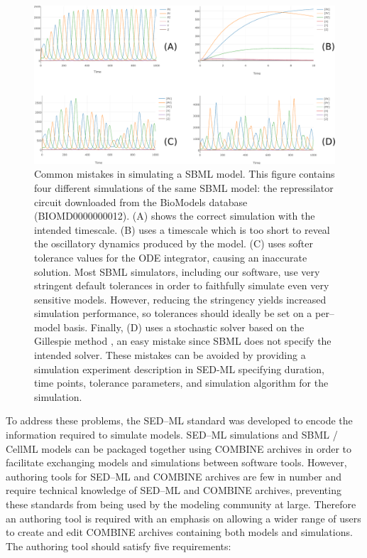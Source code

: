 \documentclass[10pt,letterpaper]{article}
\begin{document}

\begin{figure}
  \includegraphics[width=\textwidth]{elowitz-simulations.pdf}
  \caption{ Common mistakes in simulating a SBML model. This figure contains four different simulations of the same SBML model: the repressilator circuit \cite{elowitz2000synthetic} downloaded from the BioModels database (BIOMD0000000012). (A) shows the correct simulation with the intended timescale. (B) uses a timescale which is too short to reveal the oscillatory dynamics produced by the model. (C) uses softer tolerance values for the ODE integrator, causing an inaccurate solution. Most SBML simulators, including our software, use very stringent default tolerances in order to faithfully simulate even very sensitive models. However, reducing the stringency yields increased simulation performance, so tolerances should ideally be set on a per--model basis. Finally, (D) uses a stochastic solver based on the Gillespie method \cite{gillespie1977exact}, an easy mistake since SBML does not specify the intended solver. These mistakes can be avoided by providing a simulation experiment description in SED-ML specifying duration, time points, tolerance parameters, and simulation algorithm for the simulation. }
  \label{fig:mistakes}
\end{figure}
%
%

To address these problems, the SED--ML standard was developed to encode the information required to simulate models. SED--ML simulations and SBML / CellML models can be packaged together using COMBINE archives \cite{bergmann2014combine} in order to facilitate exchanging models and simulations between software tools. However, authoring tools for SED--ML and COMBINE archives are few in number \cite{bergmann2017sed,scharm2014combinearchiveweb} and require technical knowledge of SED--ML and COMBINE archives, preventing these standards from being used by the modeling community at large. Therefore an authoring tool is required with an emphasis on allowing a wider range of users to create and edit COMBINE archives containing both models and simulations. The authoring tool should satisfy five requirements:
\end{document}
